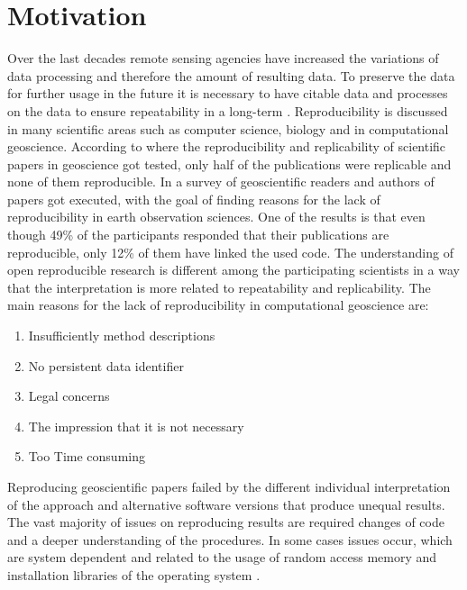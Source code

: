 \documentclass[draft,final]{vutinfth} %
\begin{document}
\section{Motivation}\label{Motivation}
Over the last decades remote sensing agencies have increased the variations of data processing and therefore the amount of resulting data. To preserve the data for further usage in the future it is necessary to have citable data and processes on the data to ensure repeatability in a long-term \cite{6352411}. Reproducibility is discussed in many scientific areas such as computer science, biology and in computational geoscience. According to \cite{Ostermann2017AdvancingSW} where the reproducibility and replicability of scientific papers in geoscience got tested, only half of the publications were replicable and none of them reproducible. In \cite{Thestateofreproducibility} a survey of geoscientific readers and authors of papers got executed, with the goal of finding reasons for the lack of reproducibility in earth observation sciences. One of the results is that even though 49\% of the participants responded that their publications are reproducible, only 12\% of them have linked the used code. The understanding of open reproducible research is different among the participating scientists in a way that the interpretation is more related to repeatability and replicability. The main reasons for the lack of reproducibility in computational geoscience are:
\begin{enumerate}
	\item Insufficiently method descriptions
	\item No persistent data identifier
	\item Legal concerns
	\item The impression that it is not necessary
	\item Too Time consuming
\end{enumerate} 

Reproducing geoscientific papers failed by the different individual interpretation of the approach and alternative software versions that produce unequal results. The vast majority of issues on reproducing results are required changes of code and a deeper understanding of the procedures. In some cases issues occur, which are system dependent and related to the usage of random access memory and installation libraries of the operating system \cite{Thestateofreproducibility}. 
\end{document}
